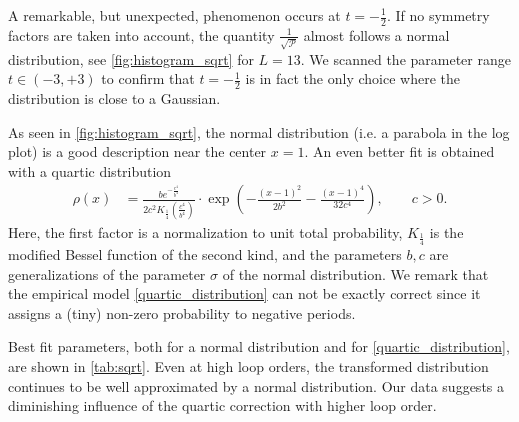 \documentclass[11pt,a4paper]{article}
\newcommand{\period}{\mathcal P}
\renewcommand{\|}{\rule[-0.4ex]{0.2ex}{1.2em}}
\begin{document}
A remarkable, but unexpected, phenomenon occurs at $t=-\frac 12$.  If no symmetry factors are taken into account, the quantity   $\frac{1}{\sqrt{\period}}$ almost follows a normal distribution, see \cref{fig:histogram_sqrt} for  $L=13$. We scanned the parameter range   $t\in (-3,+3)$ to confirm that $t=-\frac 12$ is in fact the only choice where the distribution is close to a Gaussian. 




As seen  in \cref{fig:histogram_sqrt}, the normal distribution (i.e. a parabola in the log plot) is a good description near the center $x=1$. An even better fit is obtained with a quartic distribution 
\begin{align}\label{quartic_distribution}
	\rho(x) &= \frac{b e^{-\frac{c^4}{b^4}}}{2c^2 K_{\frac 14} \left( \frac{c^4}{b^4} \right)  } \cdot \exp \left( - \frac{(x-1)^2}{2b^2}  - \frac{(x-1)^4}{32 c^4} \right)  , \qquad c>0.
\end{align}
Here, the first factor is a normalization to unit total probability, $K_\frac 14$ is the modified Bessel function of the second kind, and the parameters $b,c$ are generalizations of the parameter $\sigma$ of the normal distribution. We remark that the empirical model \cref{quartic_distribution}   can not be exactly correct since it assigns a (tiny) non-zero probability to negative periods.



Best fit parameters, both for a normal distribution and for \cref{quartic_distribution}, are shown in \cref{tab:sqrt}. 
Even at high loop orders, the transformed distribution continues to be well approximated by a normal distribution. Our data suggests a diminishing influence of the quartic correction with higher loop order.
\end{document}
